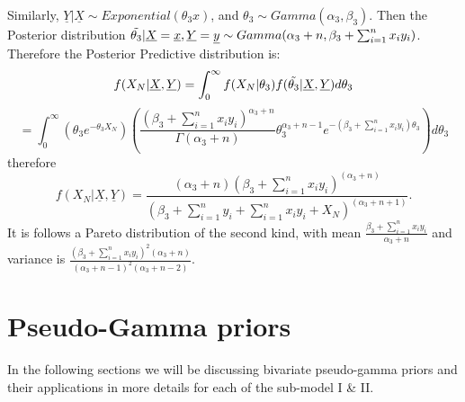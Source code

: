 \documentclass[12pt]{article}    %
\numberwithin{equation}{section}
\begin{document}
Similarly, $\underline{Y}|\underline{X} \sim Exponential(\theta_3x)$, and $\theta_3 \sim Gamma(\alpha_3, \beta_3)$. Then the Posterior distribution $\Tilde{\theta_3}|\underline{X}=\underline{x},\underline{Y}=\underline{y} \sim Gamma(\alpha_3+n,  \beta_3+\sum^n_{i=1}x_iy_i)$.
Therefore the Posterior Predictive distribution is:\\
\begin{equation*}
f(X_N|\underline{X},\underline{Y}) = \int_0^{\infty}f(X_N|\theta_3)f(\Tilde{\theta_3}|\underline{X},\underline{Y})d\theta_3
\end{equation*}
\begin{equation*}
= \int_0^{\infty}\left(\theta_3 e^{-\theta_3X_N}\right)\left(\frac{(\beta_3+\sum^n_{i=1}{x_iy_i})^{\alpha_3+n}}{\Gamma(\alpha_3+n)
}\theta_3^{\alpha_3+n-1}e^{-(\beta_3+\sum^n_{i=1}{x_iy_i})\theta_3}\right)d\theta_3
\end{equation*}
therefore
\begin{equation*}
f(X_N|\underline{X},\underline{Y}) = \frac{(\alpha_3+n)(\beta_3+\sum^n_{i=1}{x_iy_i})^{(\alpha_3+n)}}{(\beta_3+\sum^n_{i=1}y_i+\sum^n_{i=1}x_iy_i+X_N)^{(\alpha_3+n+1)}}.
\end{equation*}
It is follows a Pareto distribution of the second kind, with mean $\frac{\beta_3+\sum^n_{i=1}{x_iy_i}}{\alpha_3+n}$ and variance is $\frac{(\beta_3+\sum^n_{i=1}{x_iy_i})^2(\alpha_3+n)}{(\alpha_3+n-1)^2(\alpha_3+n-2)}$.


\section{Pseudo-Gamma priors}
In the following sections we will be discussing bivariate pseudo-gamma priors and their applications in more details for each of the sub-model I \& II.
\end{document}
